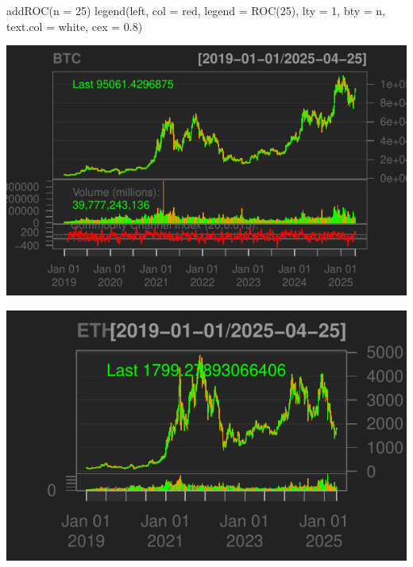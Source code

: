 \documentclass[]{tufte-handout}
\newenvironment{Shaded}{}{}
\newcommand{\AttributeTok}[1]{\textcolor[rgb]{0.49,0.56,0.16}{#1}}
\newcommand{\DecValTok}[1]{\textcolor[rgb]{0.25,0.63,0.44}{#1}}
\newcommand{\FloatTok}[1]{\textcolor[rgb]{0.25,0.63,0.44}{#1}}
\newcommand{\FunctionTok}[1]{\textcolor[rgb]{0.02,0.16,0.49}{#1}}
\newcommand{\NormalTok}[1]{#1}
\newcommand{\OtherTok}[1]{\textcolor[rgb]{0.00,0.44,0.13}{#1}}
\newcommand{\SpecialCharTok}[1]{\textcolor[rgb]{0.25,0.44,0.63}{#1}}
\newcommand{\StringTok}[1]{\textcolor[rgb]{0.25,0.44,0.63}{#1}}
\begin{document}
\begin{Shaded}
\begin{Highlighting}[]
\FunctionTok{addROC}\NormalTok{(}\AttributeTok{n =} \DecValTok{25}\NormalTok{)}
\FunctionTok{legend}\NormalTok{(}\StringTok{\textquotesingle{}left\textquotesingle{}}\NormalTok{, }\AttributeTok{col =} \StringTok{\textquotesingle{}red\textquotesingle{}}\NormalTok{, }\AttributeTok{legend =} \StringTok{\textquotesingle{}ROC(25)\textquotesingle{}}\NormalTok{, }\AttributeTok{lty =} \DecValTok{1}\NormalTok{, }\AttributeTok{bty =} \StringTok{\textquotesingle{}n\textquotesingle{}}\NormalTok{,}
       \AttributeTok{text.col =} \StringTok{\textquotesingle{}white\textquotesingle{}}\NormalTok{, }\AttributeTok{cex =} \FloatTok{0.8}\NormalTok{)}
\end{Highlighting}
\end{Shaded}

\includegraphics{cripto_update_files/figure-latex/unnamed-chunk-11-2}

\begin{Shaded}
\end{Shaded}

\includegraphics{cripto_update_files/figure-latex/unnamed-chunk-11-3}
\end{document}
